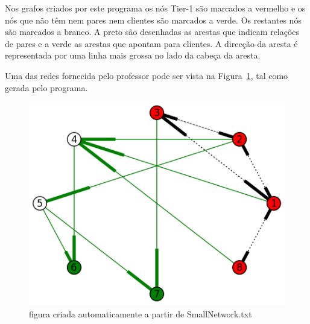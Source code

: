 \documentclass[10pt,a4paper]{article}
\begin{document}
Nos grafos criados por este programa os nós Tier-1 são marcados a vermelho e os nós que não têm nem pares nem clientes são marcados a verde. Os restantes nós são marcados a branco. A preto são desenhadas as arestas que indicam relações de pares e a verde as arestas que apontam para clientes. A direcção da aresta é representada por uma linha mais grossa no lado da cabeça da aresta.

Uma das redes fornecida pelo professor pode ser vista na Figura~\ref{fig:SmallNetwork}, tal como gerada pelo programa.

\begin{figure}[h]
\centering
\includegraphics[scale=0.6]{SmallNetwork}
\caption{figura criada automaticamente a partir de SmallNetwork.txt}
\label{fig:SmallNetwork}
\end{figure}
\end{document}
